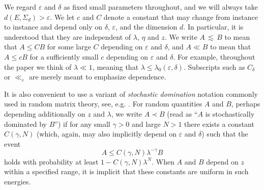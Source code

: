 \documentclass[11pt]{amsart}
\def\eps{{\varepsilon}}
\def\lsim{{\,\lesssim\,}}
\newcommand{\ldom}{\prec}
\numberwithin{equation}{section}
\numberwithin{theorem}{section}
\begin{document}
We regard $\eps$ and $\delta$ as fixed small parameters throughout, and we will always take $d(E,\Sigma_d)>\eps$.
We let $c$ and $C$ denote a constant that may change from instance to instance and depend only on $\delta$, $\eps$, and the dimension $d$. In particular, it is understood that they are independent of $\lambda$, $\eta$ and $z$.  We write $A\lsim B$ to mean that $A\leq CB$ for some large $C$ depending on $\eps$ and $\delta$, and $A\ll B$ to mean that $A \leq cB$ for a sufficiently small $c$ depending on $\eps$ and $\delta$.  For example, throughout the paper we think of $\lambda \ll 1$, meaning that $\lambda \leq \lambda_0(\eps,\delta)$. Subscripts such as $C_\delta$ or $\ll_\eps$ are merely meant to emphasize dependence.

It is also convenient to use a variant of \emph{stochastic domination} notation commonly used in random matrix theory, see, e.g. \cite{erdHos2017dynamical}.  For random quantities $A$ and $B$,
perhaps depending additionally on $z$ and $\lambda$, we write $A\ldom B$ (read as ``$A$ is stochastically dominated by $B$'') if for any small $\gamma>0$ and large $N>1$ there exists a constant $C(\gamma,N)$ (which, again, may also implicitly depend on $\eps$ and $\delta$) such that the event
\[
A \leq C(\gamma,N) \lambda^{-\gamma} B
\]
holds with probability at least $1-C(\gamma,N)\lambda^N$. When $A$ and $B$ depend on $z$ within a specified range, it is implicit that these constants are uniform in such energies.
\end{document}

